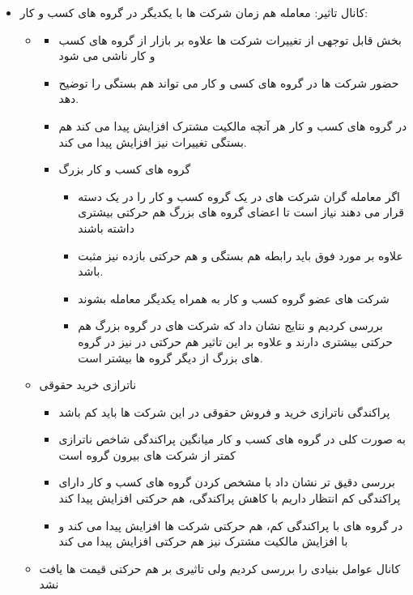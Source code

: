 \documentclass[12pt, a4paper]{article}
\begin{document}
\begin{itemize}
\item
کانال تاثیر: معامله هم زمان شرکت ها با یکدیگر در گروه های کسب و کار:
\begin{itemize}
\item
{}
\begin{itemize}
\item
بخش قابل توجهی از تغییرات 
شرکت ها علاوه بر بازار از گروه های کسب و کار ناشی می شود
\item
حضور شرکت ها در گروه های کسی و کار می تواند هم بستگی 
را توضیح دهد.
\item
در گروه های کسب و کار هر آنچه مالکیت مشترک افزایش پیدا می کند هم بستگی تغییرات 
نیز افزایش پیدا می کند.
\item
 گروه های کسب و کار بزرگ
 \begin{itemize}
 	\item 
 	اگر معامله گران شرکت های در یک گروه کسب و کار را در یک دسته قرار می دهند نیاز است تا اعضای گروه های بزرگ هم حرکتی بیشتری داشته باشند
 	\item
 	علاوه بر مورد فوق باید رابطه هم بستگی 
 	و هم حرکتی بازده نیز مثبت باشد. 
 	
 		\item 
 		شرکت های عضو گروه کسب و کار به همراه یکدیگر معامله بشوند
 		
 	
 \item
 بررسی کردیم و نتایج نشان داد که شرکت های در گروه بزرگ هم حرکتی بیشتری دارند و علاوه بر این تاثیر هم حرکتی در 
 نیز در گروه های بزرگ از دیگر گروه ها بیشتر است.
 \end{itemize}
\end{itemize}
\item 
ناترازی خرید حقوقی
\begin{itemize}
\item
پراکندگی ناترازی خرید و فروش حقوقی در این شرکت ها باید کم باشد
\item 
به صورت کلی در گروه های کسب و کار میانگین پراکندگی شاخص ناترازی کمتر از شرکت های بیرون گروه است
\item
 بررسی دقیق تر نشان داد با مشخص کردن گروه های کسب و کار دارای پراکندگی کم انتظار داریم با کاهش پراکندگی، هم حرکتی افزایش پیدا کند
 \item
 در گروه های با پراکندگی کم، هم حرکتی شرکت ها افزایش پیدا می کند و با افزایش مالکیت مشترک نیز هم حرکتی افزایش پیدا می کند
 
\end{itemize}
\item
کانال عوامل بنیادی را بررسی کردیم ولی تاثیری بر هم حرکتی قیمت ها یافت نشد

\end{itemize}
\end{itemize}
\end{document}

